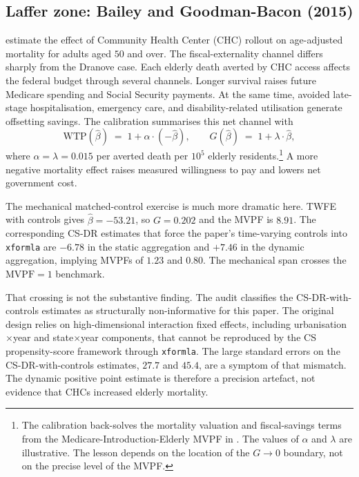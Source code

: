 \clearpage
\subsection{Laffer zone: Bailey and Goodman-Bacon (2015)}
\label{sec:mvpf_laffer}

\textcite{bailey2015war} estimate the effect of Community Health Center (CHC) rollout on age-adjusted mortality for adults aged \(50\) and over. The fiscal-externality channel differs sharply from the Dranove case. Each elderly death averted by CHC access affects the federal budget through several channels. Longer survival raises future Medicare spending and Social Security payments. At the same time, avoided late-stage hospitalisation, emergency care, and disability-related utilisation generate offsetting savings. The calibration summarises this net channel with
\begin{equation*}
\mathrm{WTP}(\hat\beta) \;=\; 1 + \alpha\cdot(-\hat\beta), \qquad G(\hat\beta) \;=\; 1 + \lambda\cdot\hat\beta,
\end{equation*}
where \(\alpha=\lambda=0.015\) per averted death per \(10^5\) elderly residents.\footnote{The calibration back-solves the mortality valuation and fiscal-savings terms from the Medicare-Introduction-Elderly MVPF in \textcite{hendren2020unified}. The values of \(\alpha\) and \(\lambda\) are illustrative. The lesson depends on the location of the \(G\to0\) boundary, not on the precise level of the MVPF.} A more negative mortality effect raises measured willingness to pay and lowers net government cost.

The mechanical matched-control exercise is much more dramatic here. TWFE with controls gives \(\hat\beta=-53.21\), so \(G=0.202\) and the MVPF is \(8.91\). The corresponding CS-DR estimates that force the paper's time-varying controls into \texttt{xformla} are \(-6.78\) in the static aggregation and \(+7.46\) in the dynamic aggregation, implying MVPFs of \(1.23\) and \(0.80\). The mechanical span crosses the \(\mathrm{MVPF}=1\) benchmark.

That crossing is not the substantive finding. The audit classifies the CS-DR-with-controls estimates as structurally non-informative for this paper. The original design relies on high-dimensional interaction fixed effects, including urbanisation\(\times\)year and state\(\times\)year components, that cannot be reproduced by the CS propensity-score framework through \texttt{xformla}. The large standard errors on the CS-DR-with-controls estimates, \(27.7\) and \(45.4\), are a symptom of that mismatch. The dynamic positive point estimate is therefore a precision artefact, not evidence that CHCs increased elderly mortality.

